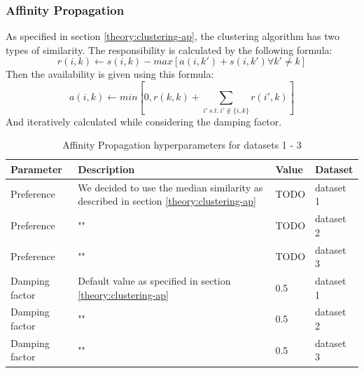 \subsubsection{Affinity Propagation}
As specified in section \ref{theory:clustering-ap}, the clustering algorithm has two types of similarity.
The responsibility is calculated by the following formula:
\begin{equation}
  r(i, k) \leftarrow s(i, k) - max [ a(i, k') + s(i, k') \forall k' \neq k ]
\end{equation}
Then the availability is given using this formula:
\begin{equation}
  a(i, k) \leftarrow min [0, r(k, k) + \sum_{i'~s.t.~i' \notin \{i, k\}}{r(i', k)}]
\end{equation}
And iteratively calculated while considering the damping factor.
\begin{table}[h]
  \begin{tabular}{|l|p{6cm}|l|l|}
    \hline
    Parameter      & Description                                                                                & Value & Dataset   \\
    \hline
    Preference     & We decided to use the median similarity as described in section \ref{theory:clustering-ap} & TODO  & dataset 1 \\
    \hline
    Preference     & ""                                                                                         & TODO  & dataset 2 \\
    \hline
    Preference     & ""                                                                                         & TODO  & dataset 3 \\
    \hline
    Damping factor & Default value as specified in section \ref{theory:clustering-ap}                           & 0.5   & dataset 1 \\
    \hline
    Damping factor & ""                                                                                         & 0.5   & dataset 2 \\
    \hline
    Damping factor & ""                                                                                         & 0.5   & dataset 3 \\
    \hline
  \end{tabular}
  \caption{Affinity Propagation hyperparameters for datasets 1 - 3}
  \label{tab:ap-formula-sklearn}
\end{table}
\newpage
